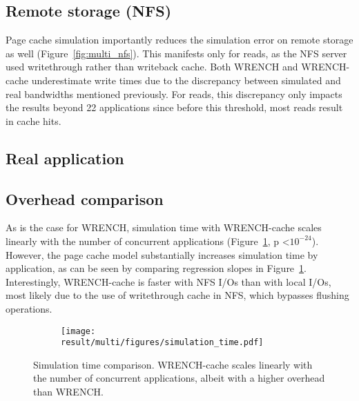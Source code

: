 \documentclass[conference]{IEEEtran}
\newcommand{\tristan}[1]{\color{orange}\textbf{From Tristan:}#1\color{black}}
\newcommand{\wrench}{WRENCH\xspace}
\begin{document}
        \subsection{Remote storage (NFS)}



            Page cache simulation importantly reduces the simulation error
            on remote storage as well (Figure~\ref{fig:multi_nfs}). This
            manifests only for reads, as the NFS server used writethrough rather than writeback cache.
            Both \wrench and \wrench-cache
            underestimate write times due to the discrepancy between
            simulated and real bandwidths mentioned previously. For reads,
            this discrepancy only impacts the results beyond 22
            applications since before this threshold, most reads result in cache
            hits.

        \subsection{Real application}

        \subsection{Overhead comparison}
        As is the case for \wrench, simulation time with \wrench-cache scales
        linearly with the number of concurrent applications
        (Figure~\ref{fig:multi_time}, p \textless $10^{-24}$). However, the page
        cache model substantially increases simulation time by
        application, as can be seen by comparing regression slopes in
        Figure~\ref{fig:multi_time}. Interestingly, \wrench-cache is faster with 
        NFS I/Os than with local I/Os, most likely due to the use of writethrough
        cache in NFS, which bypasses flushing operations.
        \begin{figure}
            \begin{subfigure}{\columnwidth}
                \centering
                \texttt{[image: result/multi/figures/simulation\_time.pdf]}
            \end{subfigure}
            \caption{Simulation time comparison. \wrench-cache scales
            linearly with the number of concurrent applications, albeit
            with a higher overhead than \wrench.}
            \label{fig:multi_time}
            \end{figure}
\end{document}
